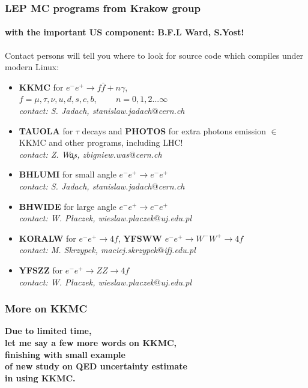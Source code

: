 \documentclass{beamer}
\newcommand{\cbl}{\color{blue}}
\begin{document}
\begin{frame}[fragile]
\frametitle{\bf LEP MC programs from Krakow group}
\framesubtitle{\bf with the important US component: B.F.L Ward, S.Yost!}

Contact persons will tell you where to look for source code
which compiles under modern Linux:
\begin{itemize}
\item
{\cbl\bf KKMC} for $e^-e^+ \to f\bar{f}+ n\gamma$,\\
$f=\mu,\tau,\nu,u,d,s,c,b$,~~~~ $n=0,1,2...\infty$\\
{\em contact: S. Jadach, stanislaw.jadach$@$cern.ch}
\item
{\cbl\bf TAUOLA} for $\tau$ decays and
{\cbl\bf PHOTOS} for extra photons emission
$\in$ KKMC and other programs, including LHC!\\
{\em contact: Z. W{\c a}s, zbigniew.was$@$cern.ch}
\item
{\cbl\bf BHLUMI} for small angle $e^-e^+ \to e^-e^+$\\
{\em contact: S. Jadach, stanislaw.jadach$@$cern.ch}
\item
{\cbl\bf BHWIDE} for large angle $e^-e^+ \to e^-e^+$\\
{\em contact: W. P\l{}aczek, wieslaw.placzek$@$uj.edu.pl}
\item
{\cbl\bf KORALW} for $e^-e^+ \to 4f $,
{\cbl\bf YFSWW} $e^-e^+ \to W^-W^+ \to 4f $\\
{\em contact: M. Skrzypek, maciej.skrzypek$@$ifj.edu.pl}
\item
{\cbl\bf YFSZZ} for $e^-e^+ \to ZZ \to 4f $\\
{\em contact: W. P\l{}aczek, wieslaw.placzek$@$uj.edu.pl}
\end{itemize}

\end{frame}


\begin{frame}[fragile]
\frametitle{\bf More on KKMC}

\bf\Large
Due to limited time,\\
let me say a few more words on KKMC,\\
finishing with small example\\
of new study on QED uncertainty estimate\\
in  using KKMC.

\end{frame}
\end{document}

